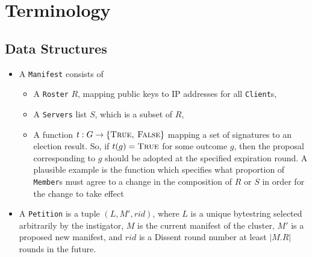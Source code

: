 \section{Terminology}
\subsection{Data Structures}
\begin{itemize}
\item A \texttt{Manifest} consists of
\begin{itemize}
  \item A \texttt{Roster} $R$, mapping public keys to IP addresses for all
    \texttt{Client}s,
  \item A \texttt{Servers} list $S$, which is a subset of $R$,
  \item A function $t : G \to \{\textsc{True, False}\}$ mapping a set of
    signatures to an election result. So, if $t(g) = \textsc{True}$ for some
    outcome $g$, then the proposal corresponding
    to $g$ should be adopted at the specified expiration round. A plausible
    example is the function which specifies what proportion of \texttt{Member}s
    must agree to a change in the composition of $R$ or $S$ in order for the
    change to take effect
\end{itemize}
  \item A \texttt{Petition} is a tuple $(L, M', rid)$, where $L$ is a unique
    bytestring selected arbitrarily by the instigator, $M$ is the current
    manifest of the cluster, $M'$ is a proposed new manifest, and $rid$ is a Dissent round number at least $|M.R|$ rounds in
    the future.

\end{itemize}

